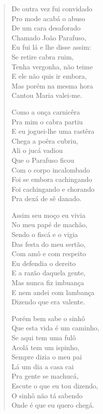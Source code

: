 \begin{verse}
De outra vez fui convidado\\
Pro mode acabá o abuso\\
De um cara desaforado\\
Chamado João Parafuso,\\
Eu fui lá e lhe disse assim:\\
Se retire cabra ruim,\\
Tenha vergonha, não teime\\
E ele não quis ir embora,\\
Mas porém na mesma hora\\
Cantou Maria valei-me.

Como a onça carnicêra\\
Pra mim o cabra partiu\\
E eu joguei-lhe uma rastêra\\
Chega a poêra cubriu,\\
Ali o jucá vadiou\\
Que o Parafuso ficou\\
Com o corpo incalombado\\
Foi se embora cachingando\\
Foi cachingando e chorando\\
Pra dexá de sê danado.

Assim seu moço eu vivia\\
No meu papé de machão,\\
Sendo o fiscá e o vigia\\
Das festa do meu sertão,\\
Com amô e com respeito\\
Eu defendia o dereito\\
E a razão daquela gente,\\
Mas nunca fiz imbuança\\
E nem andei com lambança\\
Dizendo que era valente.

Porém bem sabe o sinhô\\
Que esta vida é um caminho,\\
Se aqui tem uma fulô\\
Acolá tem um ispinho,\\
Sempre dizia o meu pai\\
Lá um dia a casa cai\\
Pra gente se machucá,\\
Escute o que eu tou dizendo,\\
O sinhô não tá sabendo\\
Onde é que eu quero chegá.


\end{verse}
